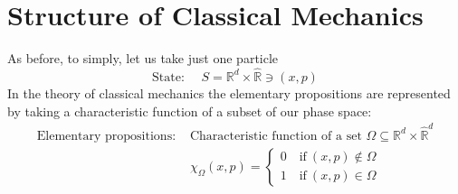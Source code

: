 \documentclass[../main.tex]{subfiles}
\begin{document}
\section[Structure of CM]{Structure of Classical Mechanics}
As before, to simply, let us take just one particle
\[
\textrm{State: } \quad S = \mathbb{R}^d \times \hat{\mathbb{R}} \ni \left(x,p\right)
\]
In the theory of classical mechanics the elementary propositions are represented by taking a characteristic function of a subset of our phase space:
\begin{align*}
    \textrm{Elementary propositions: }& \textrm{Characteristic function of a set } \Omega \subseteq \mathbb{R}^d\times\hat{\mathbb{R}}^d\\
    & \chi_{\Omega}(x,p) = \begin{cases}
    0 \quad \textrm{if} \ (x,p) \notin \Omega\\
    1 \quad \textrm{if} \ (x,p) \in \Omega
    \end{cases}
\end{align*}
\end{document}
